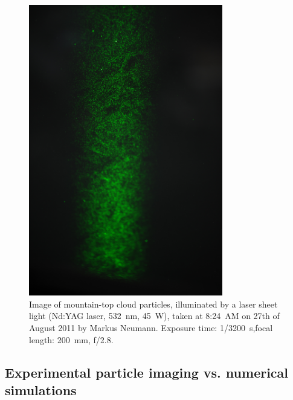 \documentclass[../main.tex]{subfiles}
\begin{document}
\begin{figure}
\centering
\noindent \includegraphics[width=20pc]{gfx/imaging_example_1617.jpg}
\caption{Image of mountain-top cloud particles, illuminated by a laser sheet light (Nd:YAG laser, 532~nm, 45~W), taken at 8:24~AM on 27th of August 2011 by Markus Neumann. Exposure time: 1/3200~s,focal length: 200~mm, f/2.8.}
\label{fig:ch2_08}
\end{figure}

\subsection{Experimental particle imaging vs. numerical simulations}
\end{document}
